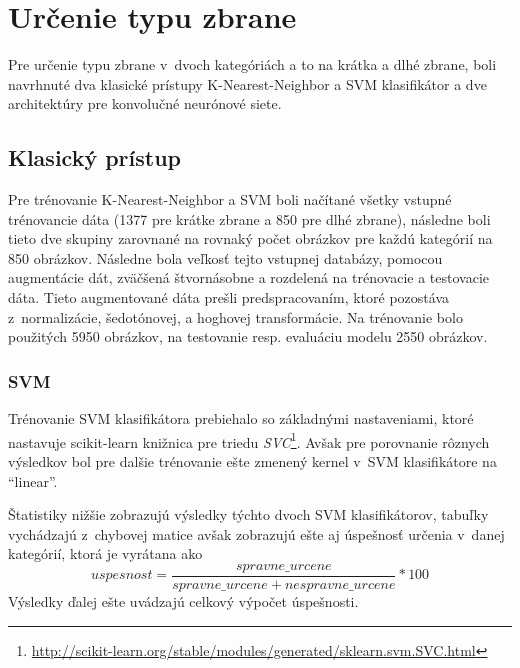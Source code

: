 
\section{Určenie typu zbrane}
Pre určenie typu zbrane v~dvoch kategóriách a to na krátka a dlhé zbrane, boli navrhnuté dva klasické prístupy
    K-Nearest-Neighbor a SVM klasifikátor a dve architektúry pre konvolučné neurónové siete.

\subsection{Klasický prístup}
Pre trénovanie K-Nearest-Neighbor a SVM boli načítané všetky vstupné trénovancie dáta (1377 pre krátke zbrane a 850 pre dlhé zbrane),
    následne boli tieto dve skupiny zarovnané na rovnaký počet obrázkov pre každú kategórií na 850 obrázkov.
Následne bola veľkosť tejto vstupnej databázy, pomocou augmentácie dát, zväčšená štvornásobne a rozdelená na trénovacie a testovacie dáta.
Tieto augmentované dáta prešli predspracovaním, ktoré pozostáva z~normalizácie, šedotónovej, a hoghovej transformácie.
Na trénovanie bolo použitých 5950 obrázkov, na testovanie resp. evaluáciu modelu 2550 obrázkov.

\subsubsection{SVM}
Trénovanie SVM klasifikátora prebiehalo so základnými nastaveniami, ktoré nastavuje scikit-learn knižnica pre triedu \textit{SVC}\footnote{\url{http://scikit-learn.org/stable/modules/generated/sklearn.svm.SVC.html}}.
Avšak pre porovnanie rôznych výsledkov bol pre dalšie trénovanie ešte zmenený kernel v~SVM klasifikátore na ``linear''.

Štatistiky nižšie zobrazujú výsledky týchto dvoch SVM klasifikátorov, tabuľky vychádzajú z~chybovej matice avšak
    zobrazujú ešte aj úspešnosť určenia v~danej kategórií, ktorá je vyrátana ako
    $$uspesnost = \frac{spravne\_urcene}{spravne\_urcene + nespravne\_urcene} * 100$$
Výsledky ďalej ešte uvádzajú celkový výpočet úspešnosti.

